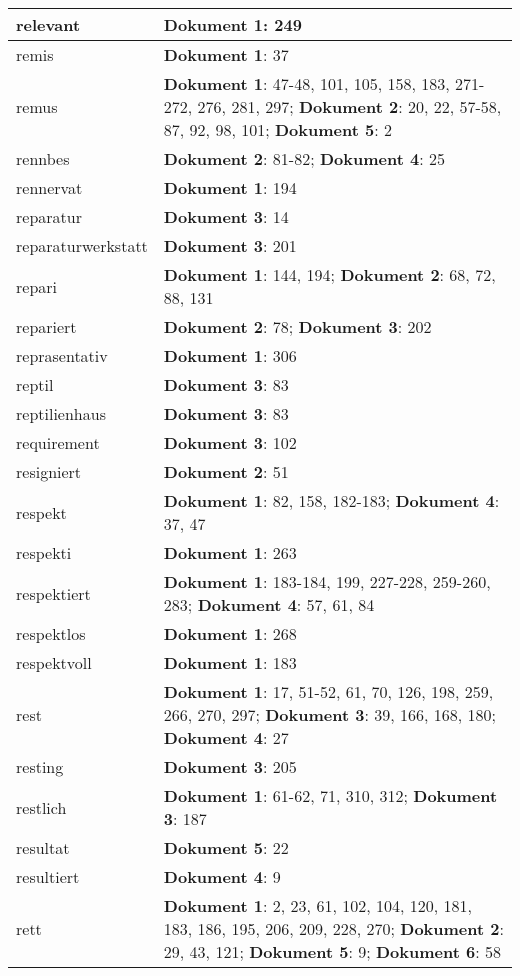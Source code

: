 \documentclass[a5paper]{article}
\begin{document}
\begin{longtable}[l]{|l|p{3in}|}
\hline
relevant & \textbf{Dokument 1}: 249 \\
\hline
remis & \textbf{Dokument 1}: 37 \\
\hline
remus & \textbf{Dokument 1}: 47-48, 101, 105, 158, 183, 271-272, 276, 281, 297; \textbf{Dokument 2}: 20, 22, 57-58, 87, 92, 98, 101; \textbf{Dokument 5}: 2 \\
\hline
rennbes & \textbf{Dokument 2}: 81-82; \textbf{Dokument 4}: 25 \\
\hline
rennervat & \textbf{Dokument 1}: 194 \\
\hline
reparatur & \textbf{Dokument 3}: 14 \\
\hline
reparaturwerkstatt & \textbf{Dokument 3}: 201 \\
\hline
repari & \textbf{Dokument 1}: 144, 194; \textbf{Dokument 2}: 68, 72, 88, 131 \\
\hline
repariert & \textbf{Dokument 2}: 78; \textbf{Dokument 3}: 202 \\
\hline
reprasentativ & \textbf{Dokument 1}: 306 \\
\hline
reptil & \textbf{Dokument 3}: 83 \\
\hline
reptilienhaus & \textbf{Dokument 3}: 83 \\
\hline
requirement & \textbf{Dokument 3}: 102 \\
\hline
resigniert & \textbf{Dokument 2}: 51 \\
\hline
respekt & \textbf{Dokument 1}: 82, 158, 182-183; \textbf{Dokument 4}: 37, 47 \\
\hline
respekti & \textbf{Dokument 1}: 263 \\
\hline
respektiert & \textbf{Dokument 1}: 183-184, 199, 227-228, 259-260, 283; \textbf{Dokument 4}: 57, 61, 84 \\
\hline
respektlos & \textbf{Dokument 1}: 268 \\
\hline
respektvoll & \textbf{Dokument 1}: 183 \\
\hline
rest & \textbf{Dokument 1}: 17, 51-52, 61, 70, 126, 198, 259, 266, 270, 297; \textbf{Dokument 3}: 39, 166, 168, 180; \textbf{Dokument 4}: 27 \\
\hline
resting & \textbf{Dokument 3}: 205 \\
\hline
restlich & \textbf{Dokument 1}: 61-62, 71, 310, 312; \textbf{Dokument 3}: 187 \\
\hline
resultat & \textbf{Dokument 5}: 22 \\
\hline
resultiert & \textbf{Dokument 4}: 9 \\
\hline
rett & \textbf{Dokument 1}: 2, 23, 61, 102, 104, 120, 181, 183, 186, 195, 206, 209, 228, 270; \textbf{Dokument 2}: 29, 43, 121; \textbf{Dokument 5}: 9; \textbf{Dokument 6}: 58 \\

\end{longtable}
\end{document}
